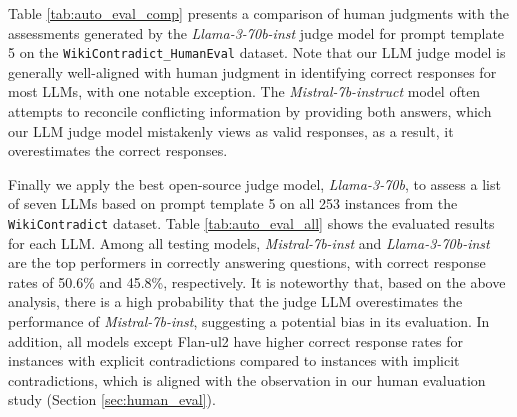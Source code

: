 \documentclass{article}
\begin{document}
Table \ref{tab:auto_eval_comp} presents a comparison of human judgments with the assessments generated by the \emph{Llama-3-70b-inst} judge model for prompt template 5 on the \texttt{WikiContradict\_HumanEval} dataset. Note that our LLM judge model is generally well-aligned with human judgment in identifying correct responses for most LLMs, with one notable exception. The \emph{Mistral-7b-instruct} model often attempts to reconcile conflicting information by providing both answers, which our LLM judge model mistakenly views as valid responses, as a result, it overestimates the correct responses.%

Finally we apply the best open-source judge model, \emph{Llama-3-70b}, to assess a list of seven LLMs based on prompt template 5 on all 253 instances from the \texttt{WikiContradict} dataset. Table \ref{tab:auto_eval_all} shows the evaluated results for each LLM. Among all testing models, \emph{Mistral-7b-inst} and \emph{Llama-3-70b-inst} are the top performers in correctly answering questions, with correct response rates of 50.6\% and 45.8\%, respectively. It is noteworthy that, based on the above analysis, there is a high probability that the judge LLM overestimates the performance of \emph{Mistral-7b-inst}, suggesting a potential bias in its evaluation. In addition, all models except Flan-ul2 have higher correct response rates for instances with explicit contradictions compared to instances with implicit contradictions, which is aligned with the observation in our human evaluation study (Section \ref{sec:human_eval}).
\end{document}
